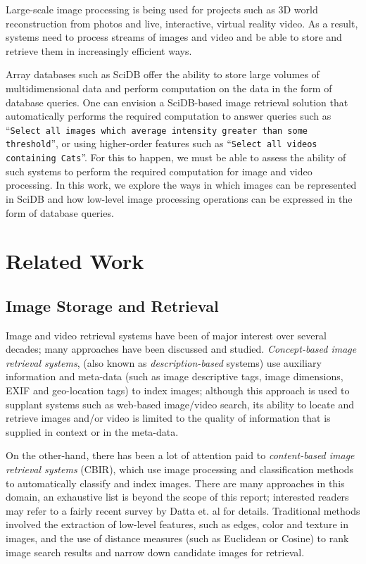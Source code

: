 \documentclass[letterpaper,twocolumn,10pt]{article}
\begin{document}
Large-scale image processing is being used for projects such as 3D world reconstruction from photos and live, interactive, virtual reality video. As a result, systems need to process streams of images and video and be able to store and retrieve them in increasingly efficient ways.

Array databases such as SciDB offer the ability to store large volumes of multidimensional data and perform computation on the data in the form of database queries. One can envision a SciDB-based image retrieval solution that automatically performs the required computation to answer queries such as ``\texttt{Select all images which average intensity greater than some threshold}'', or using higher-order features such as ``\texttt{Select all videos containing Cats}''. For this to happen, we must be able to assess the ability of such systems to perform the required computation for image and video processing. In this work, we explore the ways in which images can be represented in SciDB and how low-level image processing operations can be expressed in the form of database queries.

\section{Related Work}\label{sec:relwork}

\subsection{Image Storage and Retrieval}
Image and video retrieval systems have been of major interest over several decades; many approaches have been discussed and studied. {\em Concept-based image retrieval systems}, (also known as {\em description-based} \cite{ASI:ASI1153} systems) use auxiliary information and meta-data (such as image descriptive tags, image dimensions, EXIF and geo-location tags) to index images; although this approach is used to supplant systems such as web-based image/video search, its ability to locate and retrieve images and/or video is limited to the quality of information that is supplied in context or in the meta-data.

On the other-hand, there has been a lot of attention paid to {\em content-based image retrieval systems} (CBIR), which use image processing and classification methods to automatically classify and index images. There are many approaches in this domain, an exhaustive list is beyond the scope of this report; interested readers may refer to a fairly recent survey by Datta et. al \cite{Datta:2008} for details. Traditional methods involved the extraction of low-level features, such as edges, color and texture in images, and the use of distance measures (such as Euclidean or Cosine) to rank image search results and narrow down candidate images for retrieval.
\end{document}
